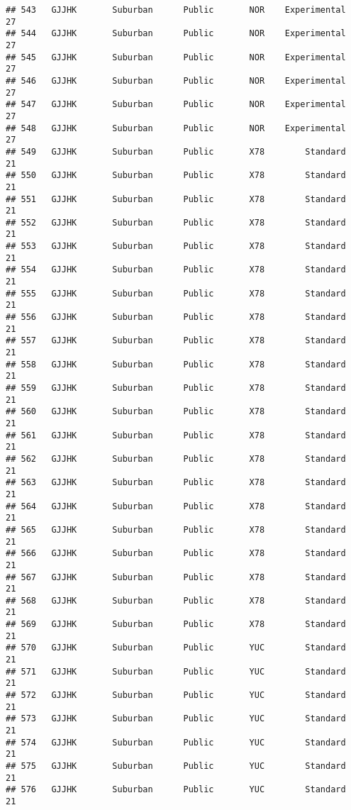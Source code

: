 \documentclass[
]{article}
\begin{document}
\begin{verbatim}
## 543   GJJHK       Suburban      Public       NOR    Experimental        27
## 544   GJJHK       Suburban      Public       NOR    Experimental        27
## 545   GJJHK       Suburban      Public       NOR    Experimental        27
## 546   GJJHK       Suburban      Public       NOR    Experimental        27
## 547   GJJHK       Suburban      Public       NOR    Experimental        27
## 548   GJJHK       Suburban      Public       NOR    Experimental        27
## 549   GJJHK       Suburban      Public       X78        Standard        21
## 550   GJJHK       Suburban      Public       X78        Standard        21
## 551   GJJHK       Suburban      Public       X78        Standard        21
## 552   GJJHK       Suburban      Public       X78        Standard        21
## 553   GJJHK       Suburban      Public       X78        Standard        21
## 554   GJJHK       Suburban      Public       X78        Standard        21
## 555   GJJHK       Suburban      Public       X78        Standard        21
## 556   GJJHK       Suburban      Public       X78        Standard        21
## 557   GJJHK       Suburban      Public       X78        Standard        21
## 558   GJJHK       Suburban      Public       X78        Standard        21
## 559   GJJHK       Suburban      Public       X78        Standard        21
## 560   GJJHK       Suburban      Public       X78        Standard        21
## 561   GJJHK       Suburban      Public       X78        Standard        21
## 562   GJJHK       Suburban      Public       X78        Standard        21
## 563   GJJHK       Suburban      Public       X78        Standard        21
## 564   GJJHK       Suburban      Public       X78        Standard        21
## 565   GJJHK       Suburban      Public       X78        Standard        21
## 566   GJJHK       Suburban      Public       X78        Standard        21
## 567   GJJHK       Suburban      Public       X78        Standard        21
## 568   GJJHK       Suburban      Public       X78        Standard        21
## 569   GJJHK       Suburban      Public       X78        Standard        21
## 570   GJJHK       Suburban      Public       YUC        Standard        21
## 571   GJJHK       Suburban      Public       YUC        Standard        21
## 572   GJJHK       Suburban      Public       YUC        Standard        21
## 573   GJJHK       Suburban      Public       YUC        Standard        21
## 574   GJJHK       Suburban      Public       YUC        Standard        21
## 575   GJJHK       Suburban      Public       YUC        Standard        21
## 576   GJJHK       Suburban      Public       YUC        Standard        21

\end{verbatim}
\end{document}
